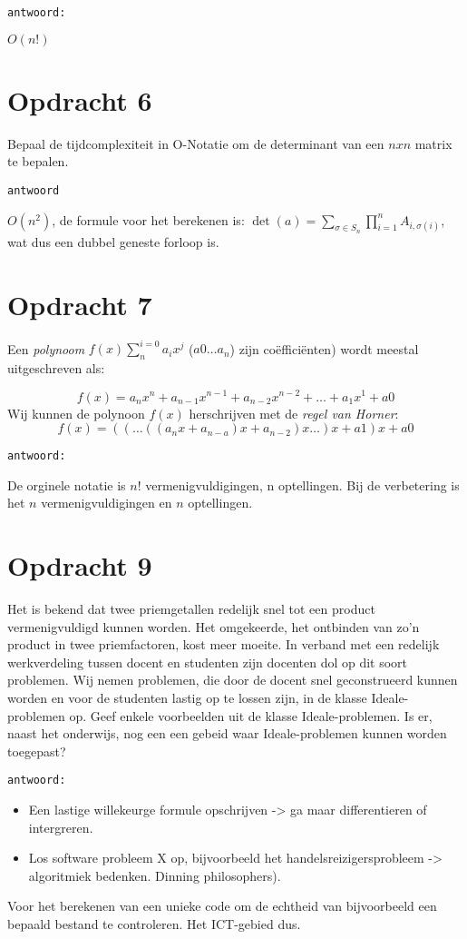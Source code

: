 \texttt{antwoord:}

$O(n!)$

\section{Opdracht 6}
Bepaal de tijdcomplexiteit in O-Notatie om de determinant van een $n x n$ matrix te bepalen.

\texttt{antwoord}

$O(n^2)$, de formule voor het berekenen is: $\det(a) = \sum_{\sigma \in S_n} \prod_{i=1}^n A_{i,\sigma(i)}$, wat dus een dubbel geneste forloop is.

\section{Opdracht 7}
Een \emph{polynoom} $f(x)\sum_{n}^{i=0} a_ix^j$ ($a0\ldots a_n$) zijn co\"{e}ffici\"{e}nten) wordt meestal uitgeschreven als:

\begin{displaymath}
f(x)=a_nx^n+a_{n-1}x^{n-1}+a_{n-2}x^{n-2}+\ldots +a_1x^1+a0
\end{displaymath}
Wij kunnen de polynoon $f(x)$ herschrijven met de \emph{regel van Horner}:
\begin{displaymath}
  f(x)=((\ldots((a_nx+a_{n-a})x+a_{n-2})x\ldots)x+a1)x+a0
\end{displaymath}

\texttt{antwoord:}

De orginele notatie is $n!$ vermenigvuldigingen, n optellingen. Bij de verbetering is het $n$ vermenigvuldigingen en $n$ optellingen.

\section{Opdracht 9}
Het is bekend dat twee priemgetallen redelijk snel tot een product vermenigvuldigd kunnen worden. Het omgekeerde, het ontbinden van zo'n product in twee priemfactoren, kost meer moeite. In verband met een redelijk werkverdeling tussen docent en studenten zijn docenten dol op dit soort problemen. Wij nemen problemen, die door de docent snel geconstrueerd kunnen worden en voor de studenten lastig op te lossen zijn, in de klasse Ideale-problemen op. Geef enkele voorbeelden uit de klasse Ideale-problemen. Is er, naast het onderwijs, nog een een gebeid waar Ideale-problemen kunnen worden toegepast?

\texttt{antwoord:}

\begin{itemize}
  \item Een lastige willekeurge formule opschrijven -> ga maar differentieren of intergreren.
  \item Los software probleem X op, bijvoorbeeld het handelsreizigersprobleem -> algoritmiek bedenken. Dinning philosophers).
\end{itemize}
Voor het berekenen van een unieke code om de echtheid van bijvoorbeeld een bepaald bestand te controleren. Het ICT-gebied dus.
